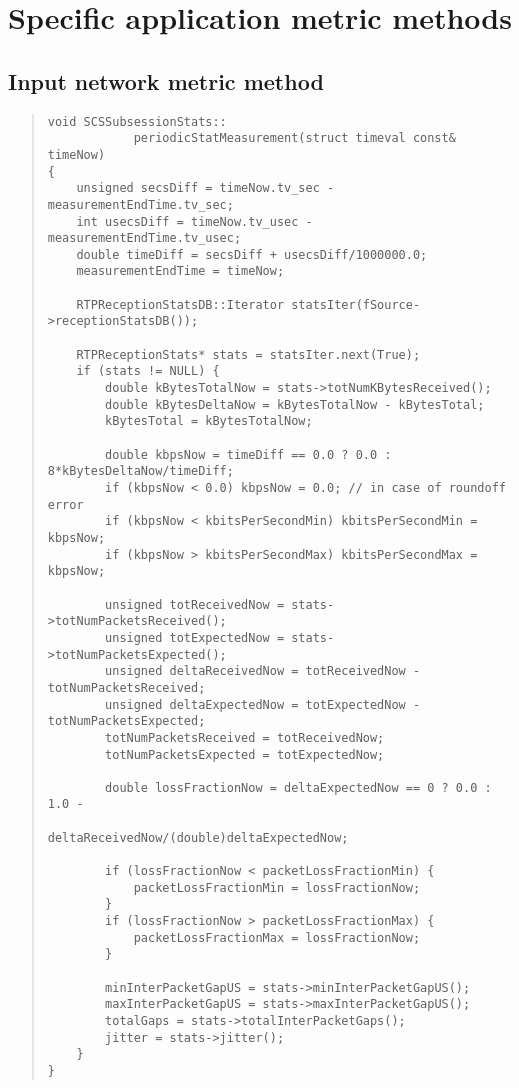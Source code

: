 \chapter{Specific application metric methods}\label{ANX:appALG}

\section{Input network metric method}\label{inmm}
\begin{quote}
\begin{verbatim}
void SCSSubsessionStats::
			periodicStatMeasurement(struct timeval const& timeNow) 
{
    unsigned secsDiff = timeNow.tv_sec - measurementEndTime.tv_sec;
    int usecsDiff = timeNow.tv_usec - measurementEndTime.tv_usec;
    double timeDiff = secsDiff + usecsDiff/1000000.0;
    measurementEndTime = timeNow;

    RTPReceptionStatsDB::Iterator statsIter(fSource->receptionStatsDB());

    RTPReceptionStats* stats = statsIter.next(True);
    if (stats != NULL) {
        double kBytesTotalNow = stats->totNumKBytesReceived();
        double kBytesDeltaNow = kBytesTotalNow - kBytesTotal;
        kBytesTotal = kBytesTotalNow;

        double kbpsNow = timeDiff == 0.0 ? 0.0 : 8*kBytesDeltaNow/timeDiff;
        if (kbpsNow < 0.0) kbpsNow = 0.0; // in case of roundoff error
        if (kbpsNow < kbitsPerSecondMin) kbitsPerSecondMin = kbpsNow;
        if (kbpsNow > kbitsPerSecondMax) kbitsPerSecondMax = kbpsNow;

        unsigned totReceivedNow = stats->totNumPacketsReceived();
        unsigned totExpectedNow = stats->totNumPacketsExpected();
        unsigned deltaReceivedNow = totReceivedNow - totNumPacketsReceived;
        unsigned deltaExpectedNow = totExpectedNow - totNumPacketsExpected;
        totNumPacketsReceived = totReceivedNow;
        totNumPacketsExpected = totExpectedNow;

        double lossFractionNow = deltaExpectedNow == 0 ? 0.0 : 1.0 -
        							 deltaReceivedNow/(double)deltaExpectedNow;

        if (lossFractionNow < packetLossFractionMin) {
            packetLossFractionMin = lossFractionNow;
        }
        if (lossFractionNow > packetLossFractionMax) {
            packetLossFractionMax = lossFractionNow;
        }

        minInterPacketGapUS = stats->minInterPacketGapUS();
        maxInterPacketGapUS = stats->maxInterPacketGapUS();
        totalGaps = stats->totalInterPacketGaps();
        jitter = stats->jitter();
    }
}
\end{verbatim}
\end{quote} 
